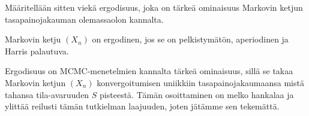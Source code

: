 Määritellään sitten viekä ergodisuus, joka on tärkeä ominaisuus Markovin ketjun tasapainojakauman olemassaolon kannalta.

\begin{maar}
	Markovin ketju $(X_n)$ on ergodinen, jos se on pelkistymätön, aperiodinen ja Harris palautuva.
\end{maar}

Ergodisuus on MCMC-menetelmien kannalta tärkeä ominaisuus, sillä se takaa Markovin ketjun $(X_n)$ konvergoitumisen uniikkiin tasapainojakaumaansa mistä tahansa tila-avaruuden $S$ pisteestä. Tämän osoittaminen on melko hankalaa ja ylittää reilusti tämän tutkielman laajuuden, joten jätämme sen tekemättä.



